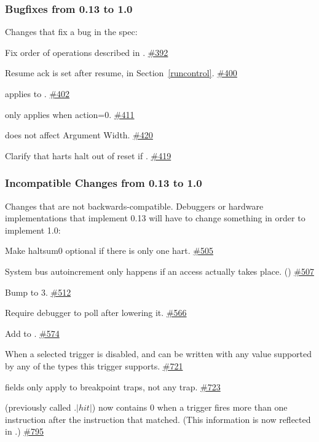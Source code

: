 \newcommand{\PR}[1]{\href{https://github.com/riscv/riscv-debug-spec/pull/#1}{\##1}}

\subsubsection{Bugfixes from 0.13 to 1.0}

\begin{steps}{Changes that fix a bug in the spec:}
    \item Fix order of operations described in \RdmSbdataZero. \PR{392}
    \item Resume ack is set after resume, in Section~\ref{runcontrol}. \PR{400}
    \item \FcsrTextraThirtytwoSselect applies to \FcsrTextraThirtytwoSvalue. \PR{402}
    \item \FcsrTcontrolMte only applies when action=0. \PR{411}
    \item \FacAccessmemoryAamsize does not affect Argument Width. \PR{420}
    \item Clarify that harts halt out of reset if . \PR{419}
\end{steps}

\subsubsection{Incompatible Changes from 0.13 to 1.0}

\begin{steps}{Changes that are not backwards-compatible. Debuggers or
hardware implementations that implement 0.13 will have to change something in
order to implement 1.0:}
    \item Make haltsum0 optional if there is only one hart. \PR{505}
    \item System bus autoincrement only happens if an access actually
    takes place. (\RdmSbdataZero) \PR{507}
    \item Bump \FdmDmstatusVersion to 3. \PR{512}
    \item Require debugger to poll \FdmDmcontrolDmactive after lowering it. \PR{566}
    \item Add \FcsrIcountPending to \RcsrIcount. \PR{574}
    \item When a selected trigger is disabled, \RcsrTdataTwo and \RcsrTdataThree
    can be written with any value supported by any of the types this trigger
    supports. \PR{721}
    \item \RcsrTcontrol fields only apply to breakpoint traps, not any trap. \PR{723}
    \item \FcsrMcontrolSixHitZero (previously called \RcsrMcontrolSix.$|hit|$) now contains 0 when a
        trigger fires more than one instruction after the instruction that
        matched.  (This information is now reflected in \FcsrMcontrolSixHitOne.)
        \PR{795}
\end{steps}

